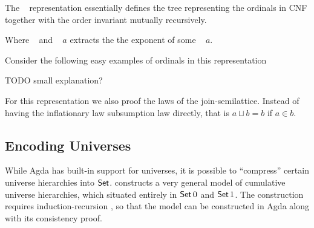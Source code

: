 \documentclass[manuscript,screen,review,anonymous]{acmart}
\begin{document}
{The \AMutualOrd~ representation essentially defines the tree representing 
the ordinals in CNF together with the order invariant mutually recursively. 

\begin{minipage}{0.5\linewidth}
  \OMDef  
  \end{minipage}
  \begin{minipage}{0.5\linewidth}
  \OOrdDef
\end{minipage}

Where \OGtDef~ and ~ $a$ extracts the the exponent 
of some \AMutualOrd~ $a$.

Consider the following easy examples of ordinals in this representation 

\begin{minipage}{0.33\linewidth}
    \LMOExA 
  \end{minipage}
  \begin{minipage}{0.33\linewidth}
    \LMOExB
  \end{minipage}
  \begin{minipage}{0.33\linewidth}
    \LMOExC
\end{minipage}
TODO small explanation?

For this representation we also proof the laws of the join-semilattice.
Instead of having the inflationary law subsumption law directly, 
that is $a \sqcup b = b$ if $a \in b$.





\subsection{Encoding Universes}
\label{sec:encoding-universes}

While Agda has built-in support for universes, it is possible to
``compress'' certain universe hierarchies into
$\ASet$. \citet{DBLP:conf/csl/Kovacs22} constructs a very general model
of cumulative universe hierarchies, which situated entirely in $\ASeti{0}$
and $\ASeti{1}$. The construction requires induction-recursion
\cite{DBLP:conf/tlca/DybjerS99}, so that the model can be constructed
in Agda along with its consistency proof.

}
\end{document}
